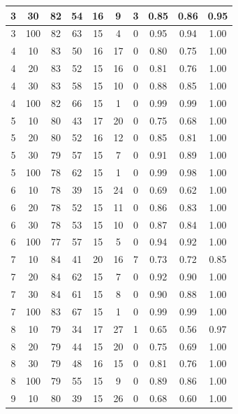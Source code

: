 \begin{longtable}{ |c|c|c|c|c|c|c|c|c|c| }
            3 & 30 & 82 & 54 & 16 & 9 & 3 & 0.85 & 0.86 & 0.95 \\ \hline
            3 & 100 & 82 & 63 & 15 & 4 & 0 & 0.95 & 0.94 & 1.00 \\ \hline
            4 & 10 & 83 & 50 & 16 & 17 & 0 & 0.80 & 0.75 & 1.00 \\ \hline
            4 & 20 & 83 & 52 & 15 & 16 & 0 & 0.81 & 0.76 & 1.00 \\ \hline
            4 & 30 & 83 & 58 & 15 & 10 & 0 & 0.88 & 0.85 & 1.00 \\ \hline
            4 & 100 & 82 & 66 & 15 & 1 & 0 & 0.99 & 0.99 & 1.00 \\ \hline
            5 & 10 & 80 & 43 & 17 & 20 & 0 & 0.75 & 0.68 & 1.00 \\ \hline
            5 & 20 & 80 & 52 & 16 & 12 & 0 & 0.85 & 0.81 & 1.00 \\ \hline
            5 & 30 & 79 & 57 & 15 & 7 & 0 & 0.91 & 0.89 & 1.00 \\ \hline
            5 & 100 & 78 & 62 & 15 & 1 & 0 & 0.99 & 0.98 & 1.00 \\ \hline
            6 & 10 & 78 & 39 & 15 & 24 & 0 & 0.69 & 0.62 & 1.00 \\ \hline
            6 & 20 & 78 & 52 & 15 & 11 & 0 & 0.86 & 0.83 & 1.00 \\ \hline
            6 & 30 & 78 & 53 & 15 & 10 & 0 & 0.87 & 0.84 & 1.00 \\ \hline
            6 & 100 & 77 & 57 & 15 & 5 & 0 & 0.94 & 0.92 & 1.00 \\ \hline
            7 & 10 & 84 & 41 & 20 & 16 & 7 & 0.73 & 0.72 & 0.85 \\ \hline
            7 & 20 & 84 & 62 & 15 & 7 & 0 & 0.92 & 0.90 & 1.00 \\ \hline
            7 & 30 & 84 & 61 & 15 & 8 & 0 & 0.90 & 0.88 & 1.00 \\ \hline
            7 & 100 & 83 & 67 & 15 & 1 & 0 & 0.99 & 0.99 & 1.00 \\ \hline
            8 & 10 & 79 & 34 & 17 & 27 & 1 & 0.65 & 0.56 & 0.97 \\ \hline
            8 & 20 & 79 & 44 & 15 & 20 & 0 & 0.75 & 0.69 & 1.00 \\ \hline
            8 & 30 & 79 & 48 & 16 & 15 & 0 & 0.81 & 0.76 & 1.00 \\ \hline
            8 & 100 & 79 & 55 & 15 & 9 & 0 & 0.89 & 0.86 & 1.00 \\ \hline
            9 & 10 & 80 & 39 & 15 & 26 & 0 & 0.68 & 0.60 & 1.00 \\ \hline

\end{longtable}
